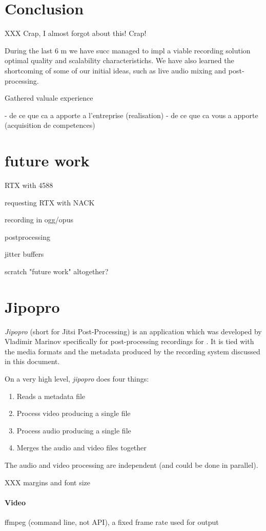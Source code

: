 \documentclass[twoside,openright,a4paper,12pt,english]{article}
\begin{document}
\section{Conclusion}
\label{conclusion}
XXX Crap, I almost forgot about this! Crap!

During the last 6 m we have succ managed to impl a viable recording solution optimal quality and scalability characteristichs. We have also learned the shortcoming of some of our initial ideas, such as live audio mixing and post-processing.

Gathered valuale experience

- de ce que ca a apporte a l’entreprise (realisation)
- de ce que ca vous a apporte (acquisition de competences)

\section{future work}
\label{future-work}
RTX with 4588

requesting RTX with NACK

recording in ogg/opus

postprocessing

jitter buffers

scratch "future work" altogether?


\appendix
\section{Jipopro}
\label{jipopro}
\emph{Jipopro} (short for Jitsi Post-Processing) is an application which was developed
by Vladimir Marinov specifically for post-processing recordings for \jm. It is tied with the
media formats and the metadata produced by the recording system discussed in this document.

On a very high level, \emph{jipopro} does four things:
\begin{enumerate}
\item Reads a metadata file
\item Process video producing a single file
\item Process audio producing a single file
\item Merges the audio and video files together
\end{enumerate}

The audio and video processing are independent (and could be done in parallel).


XXX margins and font size
\paragraph*{Video}
ffmpeg (command line, not API),
a fixed frame rate used for output
\end{document}
